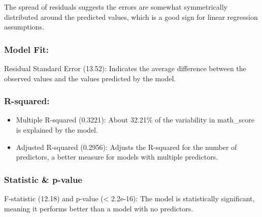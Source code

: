 \documentclass[
  12pt,
]{article}
\providecommand{\tightlist}{%
  \setlength{\itemsep}{0pt}\setlength{\parskip}{0pt}}
\begin{document}
The spread of residuals suggests the errors are somewhat symmetrically
distributed around the predicted values, which is a good sign for linear
regression assumptions.

\hypertarget{model-fit}{%
\subsubsection{Model Fit:}\label{model-fit}}

Residual Standard Error (13.52): Indicates the average difference
between the observed values and the values predicted by the model.

\hypertarget{r-squared}{%
\subsubsection{R-squared:}\label{r-squared}}

\begin{itemize}
\tightlist
\item
  Multiple R-squared (0.3221): About 32.21\% of the variability in
  math\_score is explained by the model.
\item
  Adjusted R-squared (0.2956): Adjusts the R-squared for the number of
  predictors, a better measure for models with multiple predictors.
\end{itemize}

\hypertarget{statistic-p-value}{%
\subsubsection{Statistic \& p-value}\label{statistic-p-value}}

F-statistic (12.18) and p-value (\textless{} 2.2e-16): The model is
statistically significant, meaning it performs better than a model with
no predictors.
\end{document}
